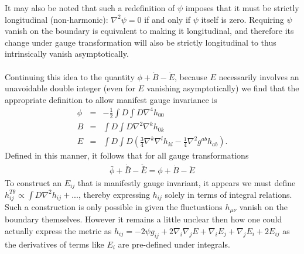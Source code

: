\documentclass[10pt,letterpaper]{article}
\numberwithin{equation}{section}
\begin{document}
\begin{appendices}
It may also be noted that such a redefinition of $\psi$ imposes that it must be strictly longitudinal (non-harmonic): $\nabla^2\psi = 0$ if and only if $\psi$ itself is zero. Requiring $\psi$ vanish on the boundary is equivalent to making it longitudinal, and therefore its change under gauge transformation will also be strictly longitudinal to thus intrinsically vanish asymptotically. 
\\ \\
Continuing this idea to the quantity $\phi+\dot B -\ddot E$, because $E$ necessarily involves an unavoidable double integer (even for $E$ vanishing asymptotically) we find that the appropriate definition to allow manifest gauge invariance is
\begin{eqnarray}
\phi &=& -\tfrac12 \int D\int D \nabla^4  h_{00}
\nonumber\\
B &=& \int D\int D \nabla^2\nabla^k h_{0k}
\nonumber\\
E &=& \int D\int D \left( \tfrac34\nabla^k\nabla^l h_{kl}-\tfrac14 \nabla^2 g^{ab}h_{ab}\right).
\end{eqnarray}
Defined in this manner, it follows that for all gauge transformations
\begin{eqnarray}
 \bar \phi + \dot{\bar B} - \ddot{\bar E} = \phi + \dot B - \ddot E
\end{eqnarray}
To construct an $E_{ij}$ that is manifestly gauge invariant, it appears we must define $h^{T\theta}_{ij} \propto \int D \nabla^2 h_{ij} + ...$, thereby expressing $h_{ij}$ solely in terms of integral relations. Such a construction is only possible in given the fluctuations $h_{\mu\nu}$ vanish on the boundary themselves. However it remains a little unclear then how one could actually express the metric as $h_{ij} = -2\psi g_{ij} + 2\nabla_i\nabla_j E + \nabla_i E_j+\nabla_j E_i + 2E_{ij}$ as the derivatives of terms like $E_i$ are pre-defined under integrals. 
\end{appendices}
%
\newpage
%
{}

\end{document}
